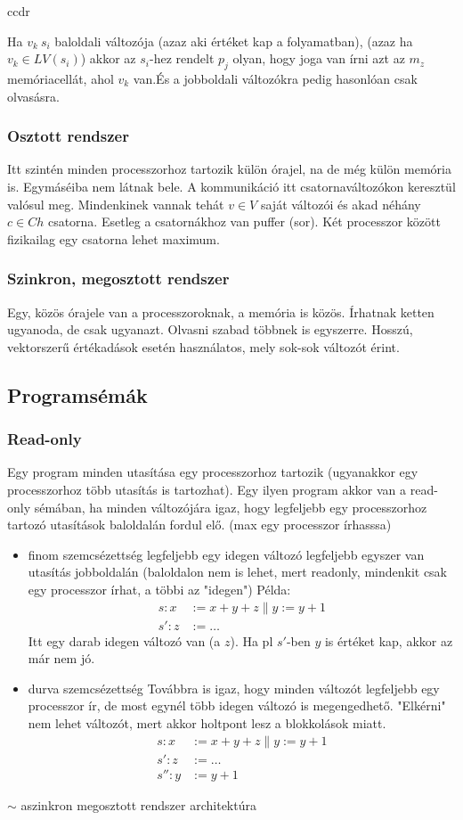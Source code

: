 ccdr\documentclass{article}
\begin{document}
Ha $v_k\ s_i$ baloldali változója (azaz aki értéket kap a folyamatban), (azaz ha $v_k \in LV(s_i)$) akkor az $s_i$-hez rendelt $p_j$ olyan, hogy joga van írni azt az $m_z$ memóriacellát, ahol $v_k$ van.És a jobboldali változókra pedig hasonlóan csak olvasásra.
\subsubsection*{Osztott rendszer}
Itt szintén minden processzorhoz tartozik külön órajel, na de még külön memória is. Egymáséiba nem látnak bele. A kommunikáció itt csatornaváltozókon keresztül valósul meg. Mindenkinek vannak tehát $v \in V$ saját változói és akad néhány $c \in Ch$ csatorna. Esetleg a csatornákhoz van puffer (sor). Két processzor között fizikailag egy csatorna lehet maximum.
\subsubsection*{Szinkron, megosztott rendszer}
Egy, közös órajele van a processzoroknak, a memória is közös. Írhatnak ketten ugyanoda, de csak ugyanazt. Olvasni szabad többnek is egyszerre. Hosszú, vektorszerű értékadások esetén használatos, mely sok-sok változót érint.
\subsection*{Programsémák}
\subsubsection*{Read-only}
Egy program minden utasítása egy processzorhoz tartozik (ugyanakkor egy processzorhoz több utasítás is tartozhat). Egy ilyen program akkor van a read-only sémában, ha minden változójára igaz, hogy legfeljebb egy processzorhoz tartozó utasítások baloldalán fordul elő. (max egy processzor írhasssa)

\begin{itemize}
\item finom szemcsézettség
legfeljebb egy idegen változó legfeljebb egyszer van utasítás jobboldalán (baloldalon nem is lehet, mert readonly, mindenkit csak egy processzor írhat, a többi az "idegen") Példa:
\begin{align*}
s: x&:= x+y+z \parallel y := y+1 \\
s': z&:= \dots
\end{align*}
Itt egy darab idegen változó van (a $z$). Ha pl $s'$-ben $y$ is értéket kap, akkor az már nem jó.
\item durva szemcsézettség
Továbbra is igaz, hogy minden változót legfeljebb egy processzor ír, de most egynél több idegen változó is megengedhető. "Elkérni" nem lehet változót, mert akkor holtpont lesz a blokkolások miatt.
\begin{align*}
s: x&:= x+y+z \parallel y := y+1 \\
s': z&:= \dots \\
s'': y&:= y+1
\end{align*}
\end{itemize}
$\sim$ aszinkron megosztott rendszer architektúra
\end{document}
